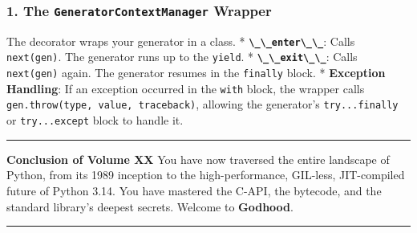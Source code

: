 \hypertarget{the-generatorcontextmanager-wrapper}{%
\subsubsection{\texorpdfstring{1. The \texttt{GeneratorContextManager}
Wrapper}{1. The GeneratorContextManager Wrapper}}\label{the-generatorcontextmanager-wrapper}}

The decorator wraps your generator in a class. *
\textbf{\passthrough{\lstinline!\_\_enter\_\_!}}: Calls
\passthrough{\lstinline!next(gen)!}. The generator runs up to the
\passthrough{\lstinline!yield!}. *
\textbf{\passthrough{\lstinline!\_\_exit\_\_!}}: Calls
\passthrough{\lstinline!next(gen)!} again. The generator resumes in the
\passthrough{\lstinline!finally!} block. * \textbf{Exception Handling}:
If an exception occurred in the \passthrough{\lstinline!with!} block,
the wrapper calls
\passthrough{\lstinline!gen.throw(type, value, traceback)!}, allowing
the generator's \passthrough{\lstinline!try...finally!} or
\passthrough{\lstinline!try...except!} block to handle it.

\begin{center}\rule{0.5\linewidth}{0.5pt}\end{center}

\textbf{Conclusion of Volume XX} You have now traversed the entire
landscape of Python, from its 1989 inception to the high-performance,
GIL-less, JIT-compiled future of Python 3.14. You have mastered the
C-API, the bytecode, and the standard library's deepest secrets. Welcome
to \textbf{Godhood}.

\begin{center}\rule{0.5\linewidth}{0.5pt}\end{center}

